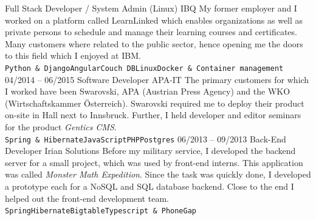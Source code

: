 \documentclass[9pt]{developercv} %
\begin{document}
\begin{entrylist}
		{Full Stack Developer / System Admin (Linux)}
		{IBQ}
		{My former employer and I worked on a platform called LearnLinked which enables organizations as well as private persons to schedule and manage their learning courses and certificates. Many customers where related to the public sector, hence opening me the doors to this field which I enjoyed at IBM.\\ 
			\texttt{Python \& Django}\slashsep\texttt{Angular}\slashsep\texttt{Couch DB}\slashsep\texttt{Linux}\slashsep\texttt{Docker \& Container management}}
	\entry
		{04/2014 -- 06/2015}
		{Software Developer}
		{APA-IT}
		{The primary customers for which I worked have been Swarovski, APA (Austrian Press Agency) and the WKO (Wirtschaftskammer Österreich). Swarovski required me to deploy their product on-site in Hall next to Innsbruck. Further, I held developer and editor seminars for the product \textit{Gentics CMS}. \\ 
			\texttt{Spring \& Hibernate}\slashsep\texttt{JavaScript}\slashsep\texttt{PHP}\slashsep\texttt{Postgres}}
	\entry
		{06/2013 -- 09/2013}
		{Back-End Developer}
		{Irian Solutions}
		{Before my military service, I developed the backend server for a small project, which was used by front-end interns. This application was called \textit{Monster Math Expedition}. Since the task was quickly done, I developed a prototype each for a NoSQL and SQL database backend. Close to the end I helped out the front-end development team. \\ 
			\texttt{Spring}\slashsep\texttt{Hibernate}\slashsep\texttt{Bigtable}\slashsep\texttt{Typescript \& PhoneGap}}
\end{entrylist}


\end{document}
